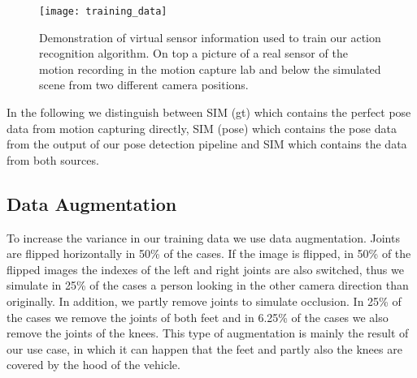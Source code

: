 \documentclass[a4paper, 10pt, conference]{ieeeconf}
\begin{document}
\begin{minipage}{\textwidth}
\begin{figure}
  \centering
  \texttt{[image: training\_data]}
  \caption{Demonstration of virtual sensor information used to train our action recognition algorithm. On top a picture of a real sensor of the motion recording in the motion capture lab and below the simulated scene from two different camera positions.}
  \label{fig:training_data}
\end{figure}

In the following we distinguish between SIM (gt) which contains the perfect pose data from motion capturing directly, SIM (pose) which contains the pose data from the output of our pose detection pipeline and SIM which contains the data from both sources.

\subsection{Data Augmentation}
To increase the variance in our training data we use data augmentation. Joints are flipped horizontally in 50\% of the cases. If the image is flipped, in 50\% of the flipped images the indexes of the left and right joints are also switched, thus we simulate in 25\% of the cases a person looking in the other camera direction than originally. In addition, we partly remove joints to simulate occlusion. In 25\% of the cases we remove the joints of both feet and in 6.25\% of the cases we also remove the joints of the knees. This type of augmentation is mainly the result of our use case, in which it can happen that the feet and partly also the knees are covered by the hood of the vehicle.





\end{minipage}
\end{document}
